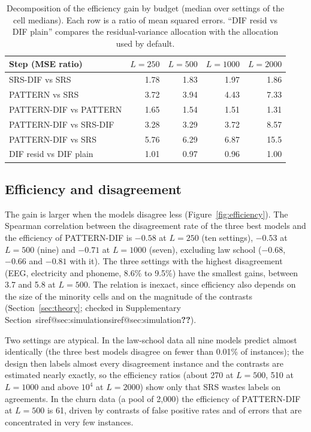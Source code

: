 \documentclass[pdflatex,sn-mathphys-num,iicol]{sn-jnl}
\makeatletter
\theoremstyle{thmstyleone}
\theoremstyle{thmstyletwo}
\theoremstyle{thmstylethree}
\newcommand{\SIref}[1]{\ifcsname siref@#1\endcsname\csname siref@#1\endcsname\else\textbf{??}\fi}
\makeatother
\begin{document}
\begin{table}[t]\centering\footnotesize
\caption{Decomposition of the efficiency gain by budget (median over settings of the cell medians). Each row is a ratio of mean squared errors. ``DIF resid vs DIF plain'' compares the residual-variance allocation with the allocation used by default.}\label{tab:decomposition}
\begin{tabular}{lrrrr}\toprule
Step (MSE ratio) & $L=250$ & $L=500$ & $L=1000$ & $L=2000$ \\\midrule
SRS-DIF vs SRS & 1.78 & 1.83 & 1.97 & 1.86 \\
PATTERN vs SRS & 3.72 & 3.94 & 4.43 & 7.33 \\
PATTERN-DIF vs PATTERN & 1.65 & 1.54 & 1.51 & 1.31 \\
PATTERN-DIF vs SRS-DIF & 3.28 & 3.29 & 3.72 & 8.57 \\
PATTERN-DIF vs SRS & 5.76 & 6.29 & 6.87 & 15.5 \\
DIF resid vs DIF plain & 1.01 & 0.97 & 0.96 & 1.00 \\
\bottomrule\end{tabular}

\end{table}

\subsection{Efficiency and disagreement}
The gain is larger when the models disagree less (Figure~\ref{fig:efficiency}). The Spearman correlation between the disagreement rate of the three best models and the efficiency of PATTERN-DIF is $-0.58$ at $L=250$ (ten settings), $-0.53$ at $L=500$ (nine) and $-0.71$ at $L=1000$ (seven), excluding law school ($-0.68$, $-0.66$ and $-0.81$ with it). The three settings with the highest disagreement (EEG, electricity and phoneme, 8.6\% to 9.5\%) have the smallest gains, between 3.7 and 5.8 at $L=500$. The relation is inexact, since efficiency also depends on the size of the minority cells and on the magnitude of the contrasts (Section~\ref{sec:theory}; checked in Supplementary Section~\SIref{sec:simulation}).

Two settings are atypical. In the law-school data all nine models predict almost identically (the three best models disagree on fewer than 0.01\% of instances); the design then labels almost every disagreement instance and the contrasts are estimated nearly exactly, so the efficiency ratios (about 270 at $L=500$, 510 at $L=1000$ and above $10^{4}$ at $L=2000$) show only that SRS wastes labels on agreements. In the churn data (a pool of 2,000) the efficiency of PATTERN-DIF at $L=500$ is 61, driven by contrasts of false positive rates and of errors that are concentrated in very few instances.
\end{document}

